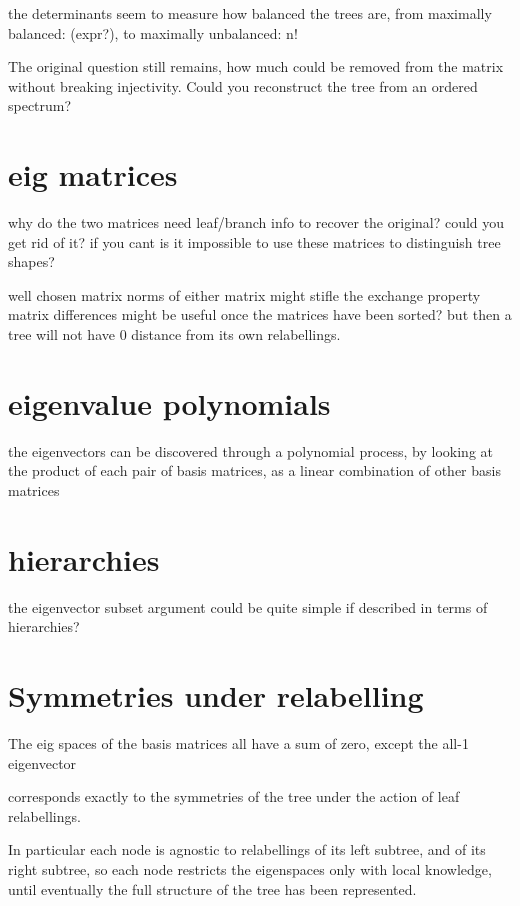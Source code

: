 \documentclass[10pt,a4paper]{report}
\begin{document}
the determinants seem to measure how balanced the trees are, from maximally
balanced: (expr?), to maximally unbalanced: n!

The original question still remains, how much could be removed from the matrix
without breaking injectivity. Could you reconstruct the tree from an ordered
spectrum?

\section{eig matrices}

why do the two matrices need leaf/branch info to recover the original? could
you get rid of it? if you cant is it impossible to use these matrices to
distinguish tree shapes?

well chosen matrix norms of either matrix might stifle the exchange property
matrix differences might be useful once the matrices have been sorted? but then
a tree will not have 0 distance from its own relabellings.

\section{eigenvalue polynomials}

the eigenvectors can be discovered through a polynomial process, by looking at
the product of each pair of basis matrices, as a linear combination of other
basis matrices

\section{hierarchies}

the eigenvector subset argument could be quite simple if described in terms of
hierarchies?

\section{Symmetries under relabelling}

The eig spaces of the basis matrices all have a sum of zero, except the all-1
eigenvector

corresponds exactly to the symmetries of the tree under the action of leaf
relabellings.

In particular each node is agnostic to relabellings of its left subtree, and of
its right subtree, so each node restricts the eigenspaces only with local
knowledge, until eventually the full structure of the tree has been
represented.
\end{document}
